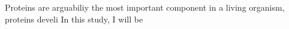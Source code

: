 Proteins are arguabiliy the most important component in a living organism, proteins develi  In this study, I will be 